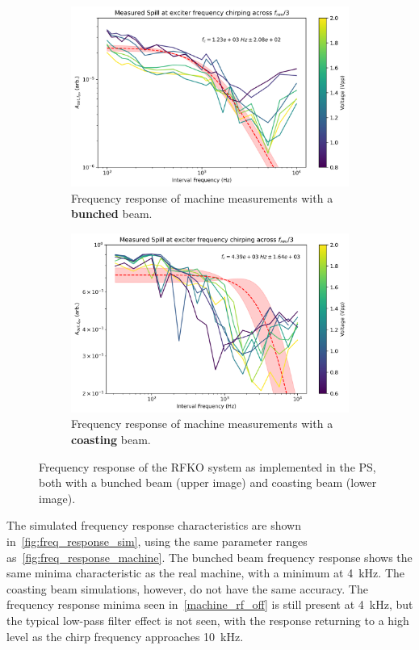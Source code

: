 \documentclass[11pt]{report}
\begin{document}
\begin{figure}
  \centering
  \begin{subfigure}[b]{0.9\linewidth}
    \includegraphics*[width=\linewidth]{machine_rf_on.png}
    \caption{Frequency response of machine measurements with a \textbf{bunched} beam.}\label{machine_rf_on}
  \end{subfigure}
  \begin{subfigure}[b]{0.9\linewidth}
    \includegraphics*[width=\linewidth]{machine_rf_off.png}
    \caption{Frequency response of machine measurements with a \textbf{coasting} beam.}\label{machine_rf_off}
  \end{subfigure}
  \caption{Frequency response of the RFKO system as implemented in the PS, both with a bunched beam (upper image) and coasting beam (lower image).}\label{fig:freq_response_machine}
\end{figure}

The simulated frequency response characteristics are shown in~\autoref{fig:freq_response_sim}, using the same parameter ranges as~\autoref{fig:freq_response_machine}. The bunched beam frequency response shows the same minima characteristic as the real machine, with a minimum at \qty{4}{\kilo\hertz}. The coasting beam simulations, however, do not have the same accuracy. The frequency response minima seen in~\autoref{machine_rf_off} is still present at \qty{4}{\kilo\hertz}, but the typical low-pass filter effect is not seen, with the response returning to a high level as the chirp frequency approaches \qty{10}{\kilo\hertz}.
\end{document}
